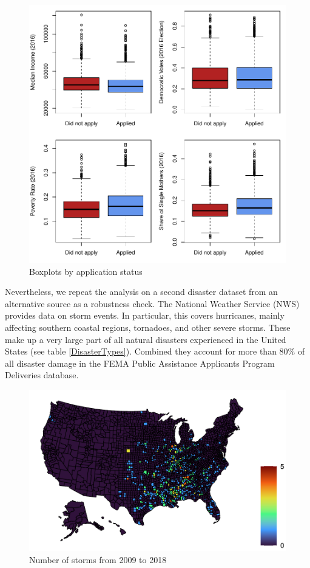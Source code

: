 \begin{figure}[!h]
	\centering
	\includegraphics[scale=1]{"../Code & Data/AssistanceCovBoxplot.pdf"}
	\caption{Boxplots by application status}
	\label{AssistCovBoxplot}
\end{figure}

Nevertheless, we repeat the analysis on a second disaster dataset from an alternative source as a robustness check. The National Weather Service (NWS) provides data on storm events. In particular, this covers hurricanes, mainly affecting southern coastal regions, tornadoes, and other severe storms. These make up a very large part of all natural disasters experienced in the United States (see table \ref{DisasterTypes}). Combined they account for more than 80\% of all disaster damage in the FEMA Public Assistance Applicants Program Deliveries database.

\begin{figure}[!h]
	\centering
	\includegraphics[scale=1]{"../Code & Data/StormMap.pdf"}
	\caption{Number of storms from 2009 to 2018}
	\label{StormMap}
\end{figure}


